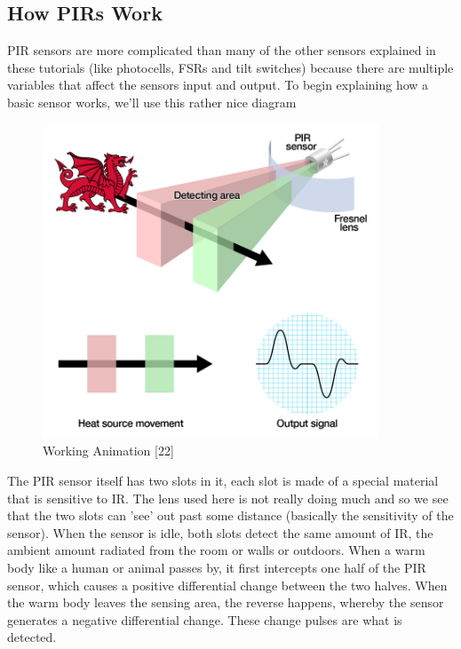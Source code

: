 \documentclass[twoside,a4paper,16pt]{book}
\begin{document}
{{			\subsection{How PIRs Work}
			PIR sensors are more complicated than many of the other sensors explained in these tutorials (like photocells, FSRs and tilt switches) because there are multiple variables that affect the sensors input and output. To begin explaining how a basic sensor works, we'll use this rather nice diagram
			\begin{figure}[ht!]
				\begin{center}
					\includegraphics[width=10.0cm]{15.png}
					\caption{Working Animation [22]}
				\end{center}
			\end{figure}
			The PIR sensor itself has two slots in it, each slot is made of a special material that is sensitive to IR. The lens used here is not really doing much and so we see that the two slots can 'see' out past some distance (basically the sensitivity of the sensor). When the sensor is idle, both slots detect the same amount of IR, the ambient amount radiated from the room or walls or outdoors. When a warm body like a human or animal passes by, it first intercepts one half of the PIR sensor, which causes a positive differential change between the two halves. When the warm body leaves the sensing area, the reverse happens, whereby the sensor generates a negative differential change. These change pulses are what is detected.
			
}}
\end{document}
